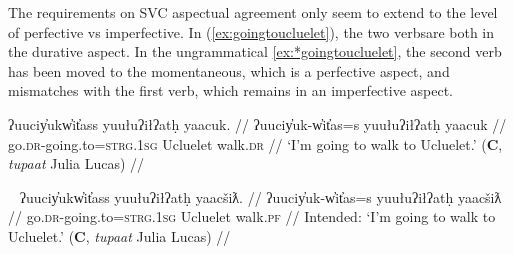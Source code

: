 \begin{comment}
\begin{tikzpicture}[sibling distance=10em,
  every node/.style = {shape=rectangle, align=center}]
\node (aspect) at (0,10) {aspect};
\node (pf) at (1,15) {perfective};
\node (impf) at (1,5) {imperfective};
\node (mo) at (8,15) {momentaneous};
\node (in) at (8,14) {inceptive};
\node (mo-grad-pf) at (8,13) {momentaneous-graduative-perf};
\node (in-grad-pf) at (8,12) {incep-grad-perf};
\node (dr-pf) at (8,11) {durative-perf};
\node (dr-grad-pf) at (8,10) {durative-grad-pf};
\node (rp-pf) at (8,9) {repet-perf};
\node (it-pf) at (8,8) {iter-perf};
\node (ct) at (5,6) {continuative};
\node (dr) at (5,5) {durative};
\node (rp) at (5,4) {repetative};
\node (it) at (5,3) {iterative};
\node (mo-grad) at (5,2) {mo-grad-pf};
\node (in-grad) at (5,1) {in-grad-pf};
\node (dr-grad) at (5,0) {dr-grad-pf};
\draw[->] (aspect) -- (pf);
\draw[->] (aspect) -- (impf);
\draw[->] (pf) -- (mo);
\draw[->] (pf) -- (in);
\draw[->] (pf) -- (mo-grad-pf);
\draw[->] (pf) -- (in-grad-pf);
\draw[->] (pf) -- (dr-pf);
\draw[->] (pf) -- (dr-grad-pf);
\draw[->] (pf) -- (rp-pf);
\draw[->] (pf) -- (it-pf);
\draw[->] (impf) -- (ct);
\draw[->] (impf) -- (dr);
\draw[->] (impf) -- (rp);
\draw[->] (impf) -- (it);
\draw[->] (impf) -- (mo-grad);
\draw[->] (impf) -- (in-grad);
\draw[->] (impf) -- (dr-grad);
\end{tikzpicture}
\end{comment}

\vspace{10pt}

The requirements on SVC aspectual agreement only seem to extend to the level of perfective vs imperfective. In (\ref{ex:goingtoucluelet}), the two verbsare both in the durative aspect. In the ungrammatical \ref{ex:*goingtoucluelet}, the second verb has been moved to the momentaneous, which is a perfective aspect, and mismatches with the first verb, which remains in an imperfective aspect.

\ex \label{ex:goingtoucluelet}
\begingl
\glpreamble ʔuuciy̓ukw̓it̓ass yuułuʔiłʔatḥ yaacuk. //
\gla ʔuuciy̓uk-w̓it̓as=s yuułuʔiłʔatḥ yaacuk //
\glb go.\textsc{dr}-going.to=\textsc{strg.1sg} Ucluelet walk.\textsc{dr} //
\glft `I'm going to walk to Ucluelet.' (\textbf{C}, \textit{tupaat} Julia Lucas) //
\endgl
\xe

\ex~ \label{ex:*goingtoucluelet}
\begingl
\glpreamble *ʔuuciy̓ukw̓it̓ass yuułuʔiłʔatḥ yaacšiƛ. //
\gla ʔuuciy̓uk-w̓it̓as=s yuułuʔiłʔatḥ yaacšiƛ //
\glb go.\textsc{dr}-going.to=\textsc{strg.1sg} Ucluelet walk.\textsc{pf} //
\glft Intended: `I'm going to walk to Ucluelet.' (\textbf{C}, \textit{tupaat} Julia Lucas) //
\endgl
\xe

